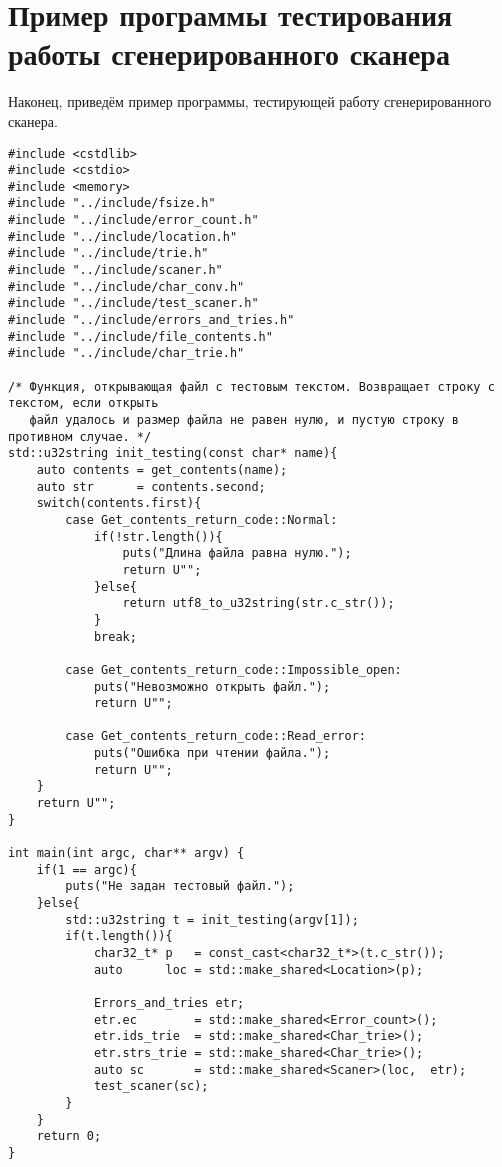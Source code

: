 \documentclass[10pt]{report}
\begin{document}
\chapter{Пример программы тестирования работы сгенерированного сканера}
Наконец, приведём пример программы, тестирующей работу сгенерированного сканера.
\begin{verbatim}
#include <cstdlib>
#include <cstdio>
#include <memory>
#include "../include/fsize.h"
#include "../include/error_count.h"
#include "../include/location.h"
#include "../include/trie.h"
#include "../include/scaner.h"
#include "../include/char_conv.h"
#include "../include/test_scaner.h"
#include "../include/errors_and_tries.h"
#include "../include/file_contents.h"
#include "../include/char_trie.h"

/* Функция, открывающая файл с тестовым текстом. Возвращает строку с текстом, если открыть 
   файл удалось и размер файла не равен нулю, и пустую строку в противном случае. */
std::u32string init_testing(const char* name){
    auto contents = get_contents(name);
    auto str      = contents.second;
    switch(contents.first){
        case Get_contents_return_code::Normal:
            if(!str.length()){
                puts("Длина файла равна нулю.");
                return U"";
            }else{
                return utf8_to_u32string(str.c_str());
            }
            break;
            
        case Get_contents_return_code::Impossible_open:
            puts("Невозможно открыть файл.");
            return U"";
            
        case Get_contents_return_code::Read_error: 
            puts("Ошибка при чтении файла.");
            return U"";
    }
    return U"";
}

int main(int argc, char** argv) {
    if(1 == argc){
        puts("Не задан тестовый файл.");
    }else{
        std::u32string t = init_testing(argv[1]);
        if(t.length()){
            char32_t* p   = const_cast<char32_t*>(t.c_str());
            auto      loc = std::make_shared<Location>(p);

            Errors_and_tries etr;
            etr.ec        = std::make_shared<Error_count>();
            etr.ids_trie  = std::make_shared<Char_trie>();
            etr.strs_trie = std::make_shared<Char_trie>();
            auto sc       = std::make_shared<Scaner>(loc,  etr);
            test_scaner(sc);
        }
    }
    return 0;
}
\end{verbatim}
\end{document}
